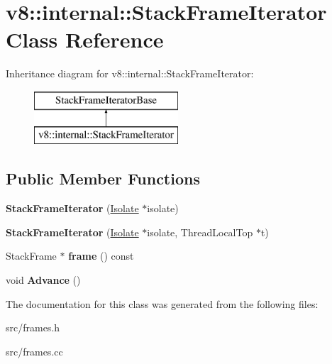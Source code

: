 \hypertarget{classv8_1_1internal_1_1_stack_frame_iterator}{}\section{v8\+:\+:internal\+:\+:Stack\+Frame\+Iterator Class Reference}
\label{classv8_1_1internal_1_1_stack_frame_iterator}
Inheritance diagram for v8\+:\+:internal\+:\+:Stack\+Frame\+Iterator\+:\begin{figure}[H]
\begin{center}
\leavevmode
\includegraphics[height=2.000000cm]{classv8_1_1internal_1_1_stack_frame_iterator}
\end{center}
\end{figure}
\subsection*{Public Member Functions}
\begin{DoxyCompactItemize}
\item 
\hypertarget{classv8_1_1internal_1_1_stack_frame_iterator_af08ff5917984721e9d3b0ea498d19333}{}{\bfseries Stack\+Frame\+Iterator} (\hyperlink{classv8_1_1internal_1_1_isolate}{Isolate} $\ast$isolate)\label{classv8_1_1internal_1_1_stack_frame_iterator_af08ff5917984721e9d3b0ea498d19333}

\item 
\hypertarget{classv8_1_1internal_1_1_stack_frame_iterator_a4f429dd1f6d793ed89d1a34c25335644}{}{\bfseries Stack\+Frame\+Iterator} (\hyperlink{classv8_1_1internal_1_1_isolate}{Isolate} $\ast$isolate, Thread\+Local\+Top $\ast$t)\label{classv8_1_1internal_1_1_stack_frame_iterator_a4f429dd1f6d793ed89d1a34c25335644}

\item 
\hypertarget{classv8_1_1internal_1_1_stack_frame_iterator_a589db497b5957249f91f7de02af3283b}{}Stack\+Frame $\ast$ {\bfseries frame} () const \label{classv8_1_1internal_1_1_stack_frame_iterator_a589db497b5957249f91f7de02af3283b}

\item 
\hypertarget{classv8_1_1internal_1_1_stack_frame_iterator_a50d8031f727ca2701312000d790e4b19}{}void {\bfseries Advance} ()\label{classv8_1_1internal_1_1_stack_frame_iterator_a50d8031f727ca2701312000d790e4b19}

\end{DoxyCompactItemize}


The documentation for this class was generated from the following files\+:\begin{DoxyCompactItemize}
\item 
src/frames.\+h\item 
src/frames.\+cc\end{DoxyCompactItemize}
